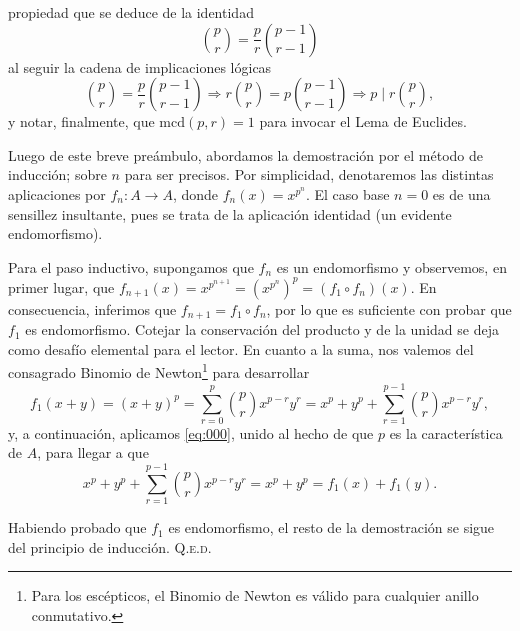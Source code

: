 \documentclass{article}
\newcommand{\mcd}{\text{mcd}}
\begin{document}
\begin{enumerate}
    propiedad que se deduce de la identidad \[\binom{p}{r} = \frac{p}{r} \binom{p - 1}{r - 1}\] al seguir la cadena de implicaciones lógicas \[\binom{p}{r} = \frac{p}{r} \binom{p - 1}{r - 1} \Rightarrow r\binom{p}{r} = p \binom{p - 1}{r - 1} \Rightarrow p \mid r \binom{p}{r},\] y notar, finalmente, que $\mcd(p, r) = 1$ para invocar el Lema de Euclides.

    Luego de este breve preámbulo, abordamos la demostración por el método de inducción; sobre $n$ para ser precisos. Por simplicidad, denotaremos las distintas aplicaciones por $f_n : A \to A$, donde $f_n(x) = x^{p^n}$. El caso base $n = 0$ es de una sensillez insultante, pues se trata de la aplicación identidad (un evidente endomorfismo). 
    
    Para el paso inductivo, supongamos que $f_n$ es un endomorfismo y observemos, en primer lugar, que $f_{n + 1}(x) = x^{p^{n + 1}} = (x^{p^n})^p = (f_1 \circ f_n)(x)$. En consecuencia, inferimos que $f_{n + 1} = f_1 \circ f_n$, por lo que es suficiente con probar que $f_1$ es endomorfismo. Cotejar la conservación del producto y de la unidad se deja como desafío elemental para el lector. En cuanto a la suma, nos valemos del consagrado Binomio de Newton\footnote{Para los escépticos, el Binomio de Newton es válido para cualquier anillo conmutativo.} para desarrollar \[f_1(x + y) = (x + y)^p = \sum_{r=0}^{p} \binom{p}{r} x^{p-r}y^r = x^p + y^p + \sum_{r=1}^{p-1} \binom{p}{r}x^{p-r}y^r,\] y, a continuación, aplicamos \eqref{eq:000}, unido al hecho de que $p$ es la característica de $A$, para llegar a que \[x^p + y^p + \sum_{r=1}^{p-1} \binom{p}{r}x^{p-r}y^r = x^p + y^p = f_1(x) + f_1(y).\]

    Habiendo probado que $f_1$ es endomorfismo, el resto de la demostración se sigue del principio de inducción. \hfill{\textsc{Q.e.d.}}
\end{enumerate}
\end{document}
